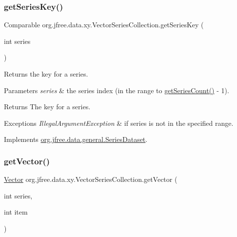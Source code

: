 \subsubsection{\texorpdfstring{get\+Series\+Key()}{getSeriesKey()}}
{\footnotesize\ttfamily Comparable org.\+jfree.\+data.\+xy.\+Vector\+Series\+Collection.\+get\+Series\+Key (\begin{DoxyParamCaption}\item[{int}]{series }\end{DoxyParamCaption})}

Returns the key for a series.


\begin{DoxyParams}{Parameters}
{\em series} & the series index (in the range {} to {\ttfamily \mbox{\hyperlink{classorg_1_1jfree_1_1data_1_1xy_1_1_vector_series_collection_ad7e902eb4447d1f31fb900fab80157b8}{get\+Series\+Count()}} -\/ 1}).\\
\hline
\end{DoxyParams}
\begin{DoxyReturn}{Returns}
The key for a series.
\end{DoxyReturn}

\begin{DoxyExceptions}{Exceptions}
{\em Illegal\+Argument\+Exception} & if {\ttfamily series} is not in the specified range. \\
\hline
\end{DoxyExceptions}


Implements \mbox{\hyperlink{interfaceorg_1_1jfree_1_1data_1_1general_1_1_series_dataset_a60488892b2314a05a012999e26a74178}{org.\+jfree.\+data.\+general.\+Series\+Dataset}}.

\mbox{\label{classorg_1_1jfree_1_1data_1_1xy_1_1_vector_series_collection_a6ab6bd07b9a775e401201ac380ee5750}} 
\subsubsection{\texorpdfstring{get\+Vector()}{getVector()}}
{\footnotesize\ttfamily \mbox{\hyperlink{classorg_1_1jfree_1_1data_1_1xy_1_1_vector}{Vector}} org.\+jfree.\+data.\+xy.\+Vector\+Series\+Collection.\+get\+Vector (\begin{DoxyParamCaption}\item[{int}]{series,  }\item[{int}]{item }\end{DoxyParamCaption})}

